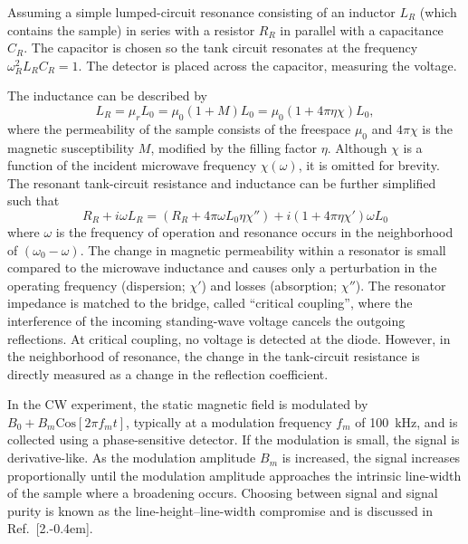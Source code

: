 Assuming a simple lumped-circuit resonance consisting of an inductor $L_R$ (which contains the sample) in series with a resistor $R_R$ in parallel with a capacitance $C_R$. The capacitor is chosen so the tank circuit resonates at the frequency $\omega_R^2 L_R C_R = 1$. The detector is placed across the capacitor, measuring the voltage. 

The inductance can be described by
\begin{equation}
    L_R = \mu_r L_0 = \mu_0 (1 + M)L_0 = \mu_0 (1 + 4 \pi \eta \chi)L_0,
\end{equation}
where the permeability of the sample consists of the freespace $\mu_0$ and $4\pi\chi$ is the magnetic susceptibility $M$, modified by the filling factor $\eta$. \cite{ramo1984fields} Although $\chi$ is a function of the incident microwave frequency $\chi(\omega)$, it is omitted for brevity. The resonant tank-circuit resistance and inductance can be further simplified such that
\begin{equation}
    R_R + i \omega L_R = (R_R + 4\pi \omega L_0 \eta \chi'') + i (1+4\pi\eta\chi')\omega L_0
\end{equation}
where $\omega$ is the frequency of operation and resonance occurs in the neighborhood of $(\omega_0-\omega)$. \cite{schumacher1970introduction} The change in magnetic permeability within a resonator is small compared to the microwave inductance and causes only a perturbation in the operating frequency (dispersion; $\chi'$) and losses (absorption; $\chi''$). The resonator impedance is matched to the bridge, called ``critical coupling'', where the interference of the incoming standing-wave voltage cancels the outgoing reflections. At critical coupling, no voltage is detected at the diode. However, in the neighborhood of resonance, the change in the tank-circuit resistance is directly measured as a change in the reflection coefficient. 

In the CW experiment, the static magnetic field is modulated by $B_0 + B_m \text{Cos}[2\pi f_m t]$, typically at a modulation frequency $f_m$ of 100~kHz, and is collected using a phase-sensitive detector. \cite{weil2007electron} If the modulation is small, the signal is derivative-like. \cite{Hyde1990pseudo} As the modulation amplitude $B_m$ is increased, the signal increases proportionally until the modulation amplitude approaches the intrinsic line-width of the sample where a broadening occurs. Choosing between signal and signal purity is known as the line-height--line-width compromise and is discussed in Ref.~[2.\kern-0.4em]. 

